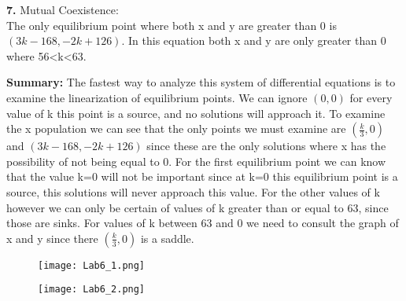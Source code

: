 \documentclass[english]{article}
\begin{document}
\begin{flushleft}
\textbf{7.} Mutual Coexistence:\\
The only equilibrium point where both x and y are greater than 0 is $(3k-168,-2k+126)$. In this equation both x and y are only greater than 0 where 56<k<63.

\textbf{Summary:} The fastest way to analyze this system of differential equations is to examine the linearization of equilibrium points. We can ignore $(0,0)$ for every value of k this point is a source, and no solutions will approach it. To examine the x population we can see that the only points we must examine are $(\frac{k}{3},0)$ and $(3k-168,-2k+126)$ since these are the only solutions where x has the possibility of not being equal to 0. For the first equilibrium point we can know that the value k=0 will not be important since at k=0 this equilibrium point is a source, this solutions will never approach this value. For the other values of k however we can only be certain of values of k greater than or equal to 63, since those are sinks. For values of k between 63 and 0 we need to consult the graph of x and y since there $(\frac{k}{3},0)$ is a saddle. 
\begin{figure}[H]
\centering
\begin{minipage}{.5\textwidth}
  \centering
  \texttt{[image: Lab6\_1.png]}
  \label{fig:test1}
\end{minipage}%
\begin{minipage}{.5\textwidth}
  \centering
  \texttt{[image: Lab6\_2.png]}
  \label{fig:test2}
\end{minipage}
\end{figure}


\end{flushleft}
\end{document}
